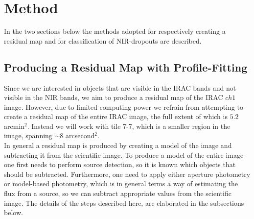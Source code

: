 \section{Method}
In the two sections below the methods adopted for respectively creating a residual map and for classification of NIR-dropouts are described.

\subsection{Producing a Residual Map with Profile-Fitting}
Since we are interested in objects that are visible in the IRAC bands and not visible in the NIR bands, we aim to produce a residual map of the IRAC $ch1$ image. However, due to limited computing power we refrain from attempting to create a residual map of the entire IRAC image, the full extent of which is $5.2$ arcmin$^2$. Instead we will work with tile 7-7, which is a smaller region in the image, spanning $\sim 8$ arcsecond$^2$. \\
In general a residual map is produced by creating a model of the image and subtracting it from the scientific image. To produce a model of the entire image one first needs to perform source detection, so it is known which objects that should be subtracted. Furthermore, one need to apply either aperture photometry or model-based photometry, which is in general terms a way of estimating the flux from a source, so we can subtract appropriate values from the scientific image. The details of the steps described here, are elaborated in the subsections below.

